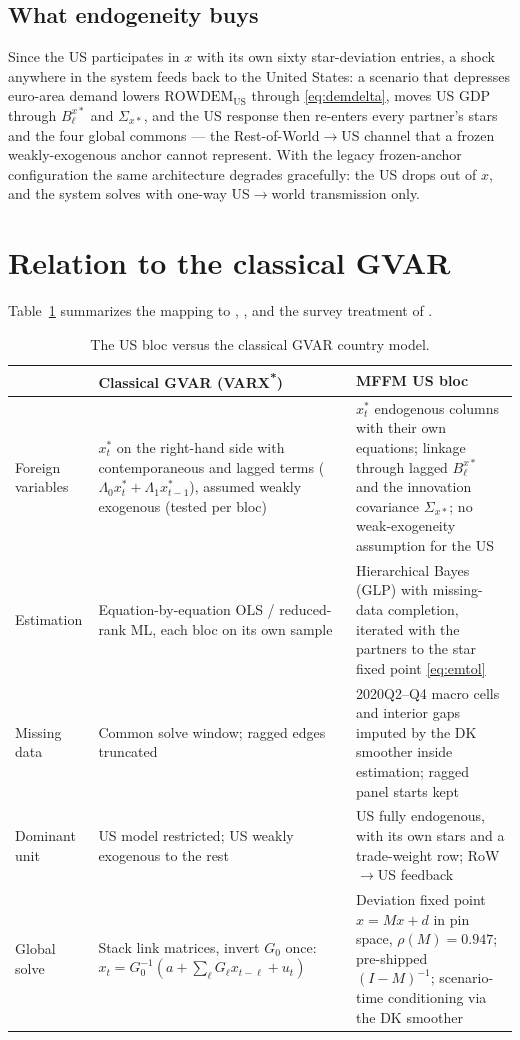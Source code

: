 \documentclass[11pt]{article}
\begin{document}
\subsection{What endogeneity buys}

Since the US participates in $x$ with its own sixty star-deviation entries, a shock anywhere in
the system feeds back to the United States: a scenario that depresses euro-area demand lowers
$\mathrm{ROWDEM}_{\mathrm{US}}$ through \eqref{eq:demdelta}, moves US GDP through
$B^{x*}_\ell$ and $\Sigma_{x*}$, and the US response then re-enters every partner's stars and the
four global commons --- the Rest-of-World$\to$US channel that a frozen weakly-exogenous anchor
cannot represent. With the legacy frozen-anchor configuration the same architecture degrades
gracefully: the US drops out of $x$, and the system solves with one-way US$\to$world
transmission only.

\section{Relation to the classical GVAR}\label{sec:pesaran}

Table~\ref{tab:pesaran} summarizes the mapping to \citet{PesaranSchuermannWeiner2004},
\citet{DeesDiMauroPesaranSmith2007}, and the survey treatment of \citet{ChudikPesaran2016}.

\begin{table}[h]
\centering
\caption{The US bloc versus the classical GVAR country model.}
\label{tab:pesaran}
\small
\begin{tabular}{p{2.6cm}p{5.6cm}p{5.9cm}}
\toprule
 & Classical GVAR (VARX\textsuperscript{*}) & MFFM US bloc \\
\midrule
Foreign variables &
$x^*_t$ on the right-hand side with contemporaneous and lagged terms
($\Lambda_0 x^*_t + \Lambda_1 x^*_{t-1}$), assumed weakly exogenous (tested per bloc) &
$x^*_t$ endogenous columns with their own equations; linkage through lagged $B^{x*}_\ell$ and
the innovation covariance $\Sigma_{x*}$; no weak-exogeneity assumption for the US \\
\addlinespace
Estimation &
Equation-by-equation OLS / reduced-rank ML, each bloc on its own sample &
Hierarchical Bayes (GLP) with missing-data completion, iterated with the partners to the star
fixed point \eqref{eq:emtol} \\
\addlinespace
Missing data &
Common solve window; ragged edges truncated &
2020Q2--Q4 macro cells and interior gaps imputed by the DK smoother inside estimation;
ragged panel starts kept \\
\addlinespace
Dominant unit &
US model restricted; US weakly exogenous to the rest &
US fully endogenous, with its own stars and a trade-weight row; RoW$\to$US feedback \\
\addlinespace
Global solve &
Stack link matrices, invert $G_0$ once: $x_t = G_0^{-1}(a + \sum_\ell G_\ell x_{t-\ell} + u_t)$ &
Deviation fixed point $x = Mx + d$ in pin space, $\rho(M)=0.947$; pre-shipped $(I-M)^{-1}$;
scenario-time conditioning via the DK smoother \\
\bottomrule
\end{tabular}
\end{table}
\end{document}
